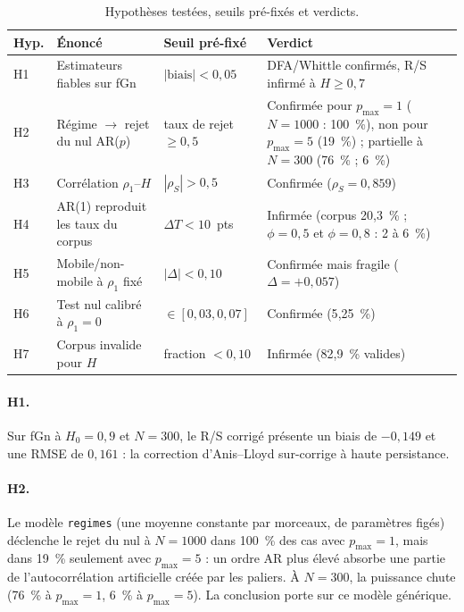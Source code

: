 \documentclass[11pt,a4paper]{article}
\newcommand{\code}[1]{\texttt{#1}}
\renewcommand{\_}{\textunderscore\penalty0\hspace{0pt}}
\begin{document}
\begin{table}[ht]
\centering
\caption{Hypothèses testées, seuils pré-fixés et verdicts.}
\label{tab:hypotheses}
\small
\begin{tabular}{p{0.9cm}p{4.4cm}p{2.6cm}p{5.2cm}}
\toprule
\textbf{Hyp.} & \textbf{Énoncé} & \textbf{Seuil pré-fixé} & \textbf{Verdict} \\
\midrule
H1 & Estimateurs fiables sur fGn & $|\text{biais}| < 0{,}05$ & DFA/Whittle confirmés, R/S infirmé à $H \ge 0{,}7$ \\
H2 & Régime $\to$ rejet du nul AR($p$) & taux de rejet $\ge 0{,}5$ & Confirmée pour $p_{\max}=1$ ($N=1000$ : 100~\%), non pour $p_{\max}=5$ (19~\%) ; partielle à $N=300$ (76~\% ; 6~\%) \\
H3 & Corrélation $\rho_1$--$H$ & $|\rho_S| > 0{,}5$ & Confirmée ($\rho_S = 0{,}859$) \\
H4 & AR(1) reproduit les taux du corpus & $\Delta T < 10$~pts & Infirmée (corpus 20,3~\% ; $\phi=0{,}5$ et $\phi=0{,}8$ : 2 à 6~\%) \\
H5 & Mobile/non-mobile à $\rho_1$ fixé & $|\Delta| < 0{,}10$ & Confirmée mais fragile ($\Delta = +0{,}057$) \\
H6 & Test nul calibré à $\rho_1 = 0$ & $\in [0{,}03, 0{,}07]$ & Confirmée (5{,}25~\%) \\
H7 & Corpus invalide pour $H$ & fraction $< 0{,}10$ & Infirmée (82{,}9~\% valides) \\
\bottomrule
\end{tabular}
\end{table}

\paragraph{H1.} Sur fGn à $H_0=0{,}9$ et $N=300$, le R/S corrigé présente un biais de
$-0{,}149$ et une RMSE de $0{,}161$ : la correction d'Anis--Lloyd sur-corrige à haute
persistance.

\paragraph{H2.} Le modèle \code{regimes} (une moyenne constante par morceaux, de paramètres
figés) déclenche le rejet du nul à $N=1000$ dans 100~\% des cas avec $p_{\max}=1$, mais dans
19~\% seulement avec $p_{\max}=5$ : un ordre AR plus élevé absorbe une partie de
l'autocorrélation artificielle créée par les paliers. À $N=300$, la puissance chute (76~\%
à $p_{\max}=1$, 6~\% à $p_{\max}=5$). La conclusion porte sur ce modèle générique.
\end{document}
